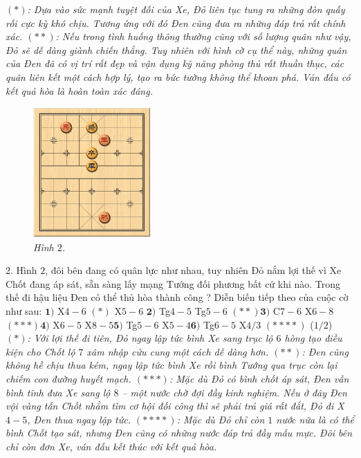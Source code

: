 \begin{multicols}{2}
	\vskip 0.1cm
	\textit{$(*)$: Dựa vào sức mạnh tuyệt đối của Xe, Đỏ liên tục tung ra những đòn quấy rối cực kỳ khó chịu. Tương ứng với đó Đen cũng đưa ra những đáp trả rất chính xác.
	\vskip 0.1cm
	$(**)$: Nếu trong tình huống thông thường cũng với số lượng quân như vậy, Đỏ sẽ dễ dàng giành chiến thắng. Tuy nhiên với hình cờ cụ thể này, những quân của Đen đã có vị trí rất đẹp và vận dụng kỹ năng phòng thủ rất thuần thục, các quân liên kết một cách hợp lý, tạo ra bức tường không thể khoan phá. Ván đấu có kết quả hòa là hoàn toàn xác đáng.}
	\begin{figure}[H]
		\vspace*{-5pt}
		\centering
		\captionsetup{labelformat= empty, justification=centering}
		\includegraphics[width= 0.4\textwidth]{2}
		\caption{\small\textit{\color{gocco}Hình $2$.}}
		\vspace*{-10pt}
	\end{figure}
	$2.$ Hình $2$, đôi bên đang có quân lực như nhau, tuy nhiên Đỏ nắm lợi thế vì Xe Chốt đang áp sát, sẵn sàng lấy mạng Tướng đối phương bất cứ khi nào. Trong thế đi hậu liệu Đen có thể thủ hòa thành công ? Diễn biến tiếp theo của cuộc cờ như sau: 
	\vskip 0.1cm
	$\pmb{1)}$	X$4-6$ $(*)$ X$5-6$ \quad $\pmb{2)}$ Tg$4-5$ Tg$5-6$ $(**)$\quad $\pmb{3)}$ C$7-6$  X$6-8$ $(***)$\quad $\pmb{4)}$ X$6-5$ X$8-5$\quad $\pmb{5)}$ Tg$5-6$ X$5-4$\quad $\pmb{6)}$ Tg$6-5$ X$4/3$ $(****)$ ($1/2$)
	\vskip 0.1cm
	\textit{$(*)$: Với lợi thế đi tiên, Đỏ ngay lập tức bình Xe sang trục lộ $6$ hòng tạo điều kiện cho Chốt lộ $7$ xâm nhập cửu cung một cách dễ dàng hơn.
	\vskip 0.1cm
	$(**)$: Đen cũng không hề chịu thua kém, ngay lập tức bình Xe rồi bình Tướng qua trục còn lại chiếm con đường huyết mạch. 
	\vskip 0.1cm
	$(***)$: Mặc dù Đỏ có bình chốt áp sát, Đen vẫn bình tĩnh đưa Xe sang lộ $8$ -- một nước chờ đợi đầy kinh nghiệm. Nếu ở đây Đen vội vàng tấn Chốt nhằm tìm cơ hội đối công thì sẽ phải trả giá rất đắt, Đỏ đi X$4-5$, Đen thua ngay lập tức.
	\vskip 0.1cm
	$(****)$: Mặc dù Đỏ chỉ còn $1$ nước nữa là có thể bình Chốt tạo sát, nhưng Đen cũng có những nước đáp trả đầy mẫu mực. Đôi bên chỉ còn đơn Xe, ván đấu kết thúc với kết quả hòa.}

\end{multicols}
